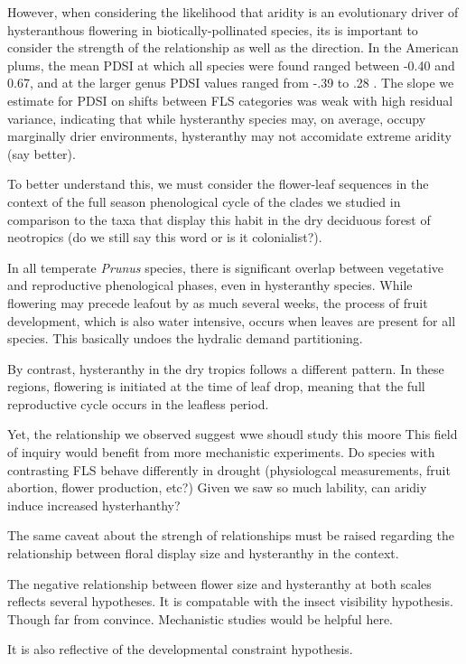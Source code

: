\documentclass{article}[11pt]
\begin{document}
However, when considering the likelihood that aridity is an evolutionary driver of hysteranthous flowering in biotically-pollinated species, its is important to consider the strength of the relationship as well as the direction.
In the American plums, the mean PDSI at which all species were found ranged between -0.40 and 0.67, and at the larger genus PDSI values ranged from -.39 to .28 . The slope we estimate for PDSI on shifts between FLS categories was weak with high residual variance, indicating that while  hysteranthy species may, on average, occupy marginally drier environments, hysteranthy may not accomidate extreme aridity (say better). 

To better understand this, we must consider the flower-leaf sequences in the context of the full season phenological cycle of the clades we studied in comparison to the taxa that display this habit in the dry deciduous forest of neotropics (do we still say this word or is it colonialist?).

In all temperate \textit{Prunus} species, there is significant overlap between vegetative and reproductive phenological phases, even in hysteranthy species. While flowering may precede leafout by as much several weeks, the process of fruit development, which is also water intensive, occurs when leaves are present for all species. This basically undoes the hydralic demand partitioning.

By contrast, hysteranthy in the dry tropics follows a different pattern. In these regions, flowering is initiated at the time of leaf drop, meaning that the full reproductive cycle occurs in the leafless period.

Yet, the relationship we observed suggest wwe shoudl study this moore
This field of inquiry would benefit from more mechanistic experiments.
Do species with contrasting FLS behave differently in drought (physiologcal measurements, fruit abortion, flower production, etc?) Given we saw so much lability, can aridiy induce increased hysterhanthy?


The same caveat about the strengh of relationships must be raised regarding the relationship between floral display size and hysteranthy in the context.

The negative relationship between flower size and hysteranthy at both scales reflects several hypotheses. It is compatable with the insect visibility hypothesis. Though far from convince. Mechanistic studies would be helpful here.

It is also reflective of the developmental constraint hypothesis.
\end{document}
